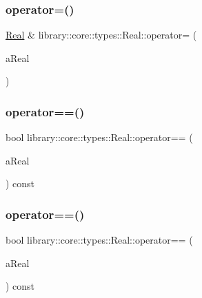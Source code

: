 \mbox{\label{classlibrary_1_1core_1_1types_1_1_real_a8d564680fd1143e4c4a2312e0d864284}} 
\subsubsection{\texorpdfstring{operator=()}{operator=()}}
{\footnotesize\ttfamily \hyperlink{classlibrary_1_1core_1_1types_1_1_real}{Real} \& library\+::core\+::types\+::\+Real\+::operator= (\begin{DoxyParamCaption}\item[{\hyperlink{classlibrary_1_1core_1_1types_1_1_real_a9c5c8826b7e5a8e39544d23fea6c0e1c}{Real\+::\+Value\+Type}}]{a\+Real }\end{DoxyParamCaption})}

\mbox{\label{classlibrary_1_1core_1_1types_1_1_real_a1839dd71d808398257af820e49b85386}} 
\subsubsection{\texorpdfstring{operator==()}{operator==()}\hspace{0.1cm}{\footnotesize\ttfamily [1/2]}}
{\footnotesize\ttfamily bool library\+::core\+::types\+::\+Real\+::operator== (\begin{DoxyParamCaption}\item[{const \hyperlink{classlibrary_1_1core_1_1types_1_1_real}{Real} \&}]{a\+Real }\end{DoxyParamCaption}) const}

\mbox{\label{classlibrary_1_1core_1_1types_1_1_real_a42db563720aaac0a5bd58a0950116ef0}} 
\subsubsection{\texorpdfstring{operator==()}{operator==()}\hspace{0.1cm}{\footnotesize\ttfamily [2/2]}}
{\footnotesize\ttfamily bool library\+::core\+::types\+::\+Real\+::operator== (\begin{DoxyParamCaption}\item[{const \hyperlink{classlibrary_1_1core_1_1types_1_1_real_a9c5c8826b7e5a8e39544d23fea6c0e1c}{Real\+::\+Value\+Type} \&}]{a\+Real }\end{DoxyParamCaption}) const}

